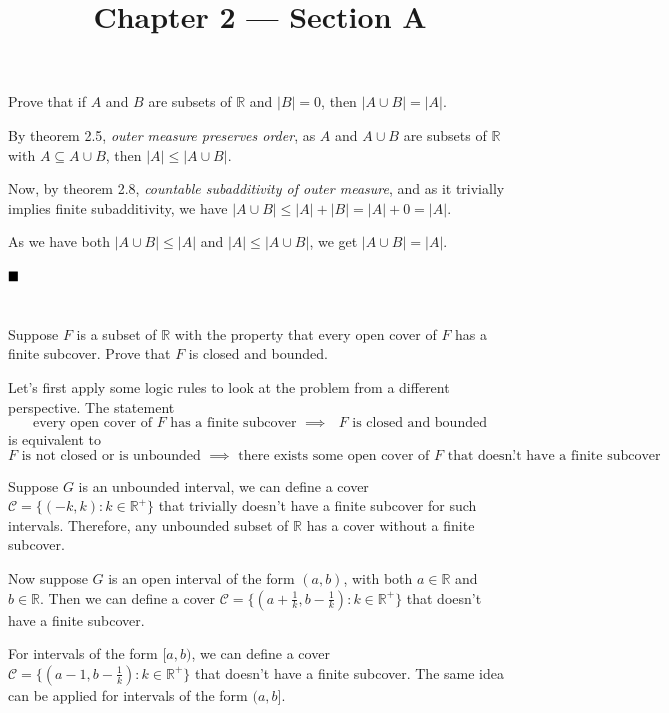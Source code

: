 \documentclass[11pt, a4paper, tikz]{article}
\newcommand{\newpara}{
	\vskip 2mm
}
\newcommand{\centsection}[1]{
	\section*{\centering{#1}}
}
\renewcommand{\qed}{\hfill\blacksquare}
\newcommand{\reals}{
	\ensuremath{\mathbb{R}}
}
\newcommand{\cover}[1]{
	\ensuremath{\mathcal{#1}}
}
\begin{document}
	\title{\textbf{Chapter 2 — Section A}}
	\maketitle
	\centsection{Exercise 1}
	
	\begin{formulationBox}
		Prove that if $A$ and $B$ are subsets of $\reals$ and $|B|=0$, then $|A\cup B| = |A|$.
	\end{formulationBox}
	
	By theorem 2.5, \textit{outer measure preserves order}, as $A$ and $A\cup B$ are subsets of $\reals$ with $A\subseteq A\cup B$, then $|A| \leq |A\cup B|$.
	\newpara
	Now, by theorem 2.8, \textit{countable subadditivity of outer measure}, and as it trivially implies finite subadditivity, we have $|A\cup B| \leq |A| + |B| = |A| + 0 = |A|$.
	\newpara
	As we have both $|A\cup B| \leq |A|$ and $|A| \leq |A\cup B|$, we get $|A\cup B| = |A|$.
	
	$\qed$
	
	\centsection{Exercise 4}
	
	\begin{formulationBox}
		Suppose $F$ is a subset of $\reals$ with the property that every open cover of $F$ has a finite subcover. Prove that $F$ is closed and bounded.
	\end{formulationBox}
	
	Let's first apply some logic rules to look at the problem from a different perspective. The statement \[\textrm{every open cover of $F$ has a finite subcover $\implies$ $F$ is closed and bounded}\] is equivalent to \[\textrm{$F$ is not closed or is unbounded $\implies$ there exists some open cover of $F$ that doesn't have a finite subcover}.\]
	
	Suppose $G$ is an unbounded interval, we can define a cover $\cover{C}=\{(-k, k):k\in\reals^+\}$ that trivially doesn't have a finite subcover for such intervals. Therefore, any unbounded subset of $\reals$ has a cover without a finite subcover.
	
	Now suppose $G$ is an open interval of the form $(a, b)$, with both $a\in\reals$ and $b\in\reals$. Then we can define a cover $\cover{C}=\{(a+\frac{1}{k}, b-\frac{1}{k}):k\in\reals^+\}$ that doesn't have a finite subcover.
	
	For intervals of the form $[a,b)$, we can define a cover $\cover{C}=\{(a-1, b-\frac{1}{k}):k\in\reals^+\}$ that doesn't have a finite subcover. The same idea can be applied for intervals of the form $(a,b]$.
	
\end{document}
